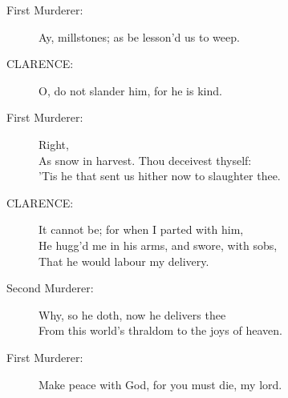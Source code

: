 \documentclass{article}
\begin{document}
\begin{description}
\item[First Murderer:] 
\hspace{1pt}Ay, millstones; as be lesson'd us to weep.\\
\end{description}
\begin{description}
\item[CLARENCE:] 
\hspace{1pt}O, do not slander him, for he is kind.\\
\end{description}
\begin{description}
\item[First Murderer:] 
\hspace{1pt}Right,\\
\hspace{1pt}As snow in harvest. Thou deceivest thyself:\\
\hspace{1pt}'Tis he that sent us hither now to slaughter thee.\\
\end{description}
\begin{description}
\item[CLARENCE:] 
\hspace{1pt}It cannot be; for when I parted with him,\\
\hspace{1pt}He hugg'd me in his arms, and swore, with sobs,\\
\hspace{1pt}That he would labour my delivery.\\
\end{description}
\begin{description}
\item[Second Murderer:] 
\hspace{1pt}Why, so he doth, now he delivers thee\\
\hspace{1pt}From this world's thraldom to the joys of heaven.\\
\end{description}
\begin{description}
\item[First Murderer:] 
\hspace{1pt}Make peace with God, for you must die, my lord.\\
\end{description}
\end{document}
